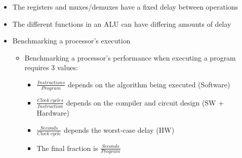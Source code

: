 \documentclass{article}
\begin{document}
\begin{itemize}
\begin{itemize}
			\item The registers and muxes/demuxes have a fixed delay between operations
			\item The different functions in an ALU can have differing amounts of delay
			\item Benchmarking a processor's execution
				\begin{itemize}
					\item Benchmarking a processor's performance when executing a program requires 3 values:
						\begin{itemize}
							\item $\displaystyle\frac{Instructions}{Program}$ depends on the algorithm being executed (Software)
							\item $\displaystyle\frac{Clock ~ cycles}{Instruction}$ depends on the compiler and circuit design (SW + Hardware)
							\item $\displaystyle\frac{Seconds}{Clock ~ cycle}$ depends the worst-case delay (HW)
							\item The final fraction is $\displaystyle\frac{Seconds}{Program}$
						\end{itemize}
				\end{itemize}
		\end{itemize}
\end{itemize}
\end{document}

